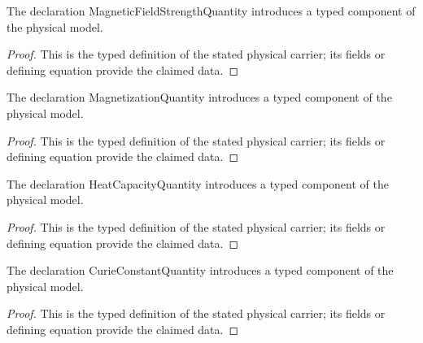 \begin{definition}
  \label{def:physics:IPhO_2026_3_B_2:aux011}
  The declaration MagneticFieldStrengthQuantity introduces a typed component of the physical model.
\end{definition}
\begin{proof}
  This is the typed definition of the stated physical carrier; its fields or defining equation provide the claimed data.
\end{proof}

\begin{definition}
  \label{def:physics:IPhO_2026_3_B_2:aux012}
  The declaration MagnetizationQuantity introduces a typed component of the physical model.
\end{definition}
\begin{proof}
  This is the typed definition of the stated physical carrier; its fields or defining equation provide the claimed data.
\end{proof}

\begin{definition}
  \label{def:physics:IPhO_2026_3_B_2:aux013}
  The declaration HeatCapacityQuantity introduces a typed component of the physical model.
\end{definition}
\begin{proof}
  This is the typed definition of the stated physical carrier; its fields or defining equation provide the claimed data.
\end{proof}

\begin{definition}
  \label{def:physics:IPhO_2026_3_B_2:aux014}
  The declaration CurieConstantQuantity introduces a typed component of the physical model.
\end{definition}
\begin{proof}
  This is the typed definition of the stated physical carrier; its fields or defining equation provide the claimed data.
\end{proof}

